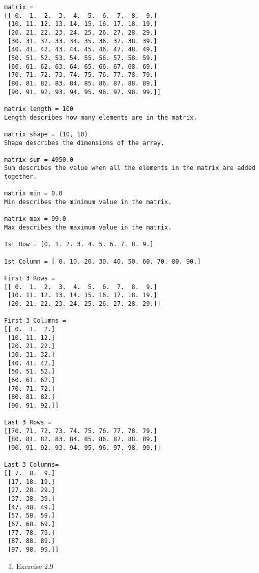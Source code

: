 \documentclass[11pt]{article}
\providecommand{\tightlist}{%
      \setlength{\itemsep}{0pt}\setlength{\parskip}{0pt}}
\begin{document}
    \begin{Verbatim}[commandchars=\\\{\}]
matrix =
[[ 0.  1.  2.  3.  4.  5.  6.  7.  8.  9.]
 [10. 11. 12. 13. 14. 15. 16. 17. 18. 19.]
 [20. 21. 22. 23. 24. 25. 26. 27. 28. 29.]
 [30. 31. 32. 33. 34. 35. 36. 37. 38. 39.]
 [40. 41. 42. 43. 44. 45. 46. 47. 48. 49.]
 [50. 51. 52. 53. 54. 55. 56. 57. 58. 59.]
 [60. 61. 62. 63. 64. 65. 66. 67. 68. 69.]
 [70. 71. 72. 73. 74. 75. 76. 77. 78. 79.]
 [80. 81. 82. 83. 84. 85. 86. 87. 88. 89.]
 [90. 91. 92. 93. 94. 95. 96. 97. 98. 99.]]

matrix length = 100
Length describes how many elements are in the matrix.

matrix shape = (10, 10)
Shape describes the dimensions of the array.

matrix sum = 4950.0
Sum describes the value when all the elements in the matrix are added together.

matrix min = 0.0
Min describes the minimum value in the matrix.

matrix max = 99.0
Max describes the maximum value in the matrix.

1st Row = [0. 1. 2. 3. 4. 5. 6. 7. 8. 9.]

1st Column = [ 0. 10. 20. 30. 40. 50. 60. 70. 80. 90.]

First 3 Rows =
[[ 0.  1.  2.  3.  4.  5.  6.  7.  8.  9.]
 [10. 11. 12. 13. 14. 15. 16. 17. 18. 19.]
 [20. 21. 22. 23. 24. 25. 26. 27. 28. 29.]]

First 3 Columns =
[[ 0.  1.  2.]
 [10. 11. 12.]
 [20. 21. 22.]
 [30. 31. 32.]
 [40. 41. 42.]
 [50. 51. 52.]
 [60. 61. 62.]
 [70. 71. 72.]
 [80. 81. 82.]
 [90. 91. 92.]]

Last 3 Rows =
[[70. 71. 72. 73. 74. 75. 76. 77. 78. 79.]
 [80. 81. 82. 83. 84. 85. 86. 87. 88. 89.]
 [90. 91. 92. 93. 94. 95. 96. 97. 98. 99.]]

Last 3 Columns=
[[ 7.  8.  9.]
 [17. 18. 19.]
 [27. 28. 29.]
 [37. 38. 39.]
 [47. 48. 49.]
 [57. 58. 59.]
 [67. 68. 69.]
 [77. 78. 79.]
 [87. 88. 89.]
 [97. 98. 99.]]

    \end{Verbatim}

    \begin{enumerate}
\def\labelenumi{\arabic{enumi}.}
\setcounter{enumi}{4}
\tightlist
\item
  Exercise 2.9
\end{enumerate}
\end{document}
